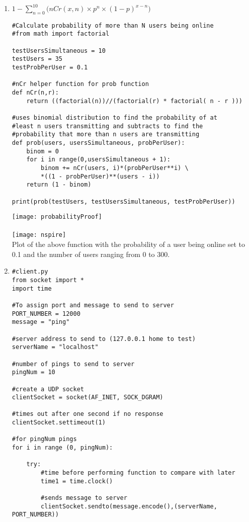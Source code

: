 \documentclass[12pt]{article}
\begin{document}
\begin{enumerate}
	\item $1 - \sum\limits_{n = 0}^{10}\big ( nCr(x,n)\times p^n \times (1-p)^{x-n}\big ) $\\
		\begin{verbatim}
#Calculate probability of more than N users being online
#from math import factorial

testUsersSimultaneous = 10
testUsers = 35
testProbPerUser = 0.1

#nCr helper function for prob function
def nCr(n,r):
	return ((factorial(n))//(factorial(r) * factorial( n - r )))

#uses binomial distribution to find the probability of at
#least n users transmitting and subtracts to find the
#probability that more than n users are transmitting
def prob(users, usersSimultaneous, probPerUser):
    binom = 0
    for i in range(0,usersSimultaneous + 1):
        binom += nCr(users, i)*(probPerUser**i) \
        *((1 - probPerUser)**(users - i))
    return (1 - binom)

print(prob(testUsers, testUsersSimultaneous, testProbPerUser))
		\end{verbatim}
		\texttt{[image: probabilityProof]}\\
		\\
		\texttt{[image: nspire]}\\
		Plot of the above function with the probability of a user being online set to 0.1 and the number of users ranging from 0 to 300.\\

	\item \begin{verbatim}
#client.py
from socket import *
import time

#To assign port and message to send to server
PORT_NUMBER = 12000
message = "ping"

#server address to send to (127.0.0.1 home to test)
serverName = "localhost"

#number of pings to send to server
pingNum = 10

#create a UDP socket
clientSocket = socket(AF_INET, SOCK_DGRAM)

#times out after one second if no response
clientSocket.settimeout(1)

#for pingNum pings
for i in range (0, pingNum):

    try:
        #time before performing function to compare with later
        time1 = time.clock()

        #sends message to server
        clientSocket.sendto(message.encode(),(serverName, PORT_NUMBER))


\end{verbatim}
\end{enumerate}
\end{document}
